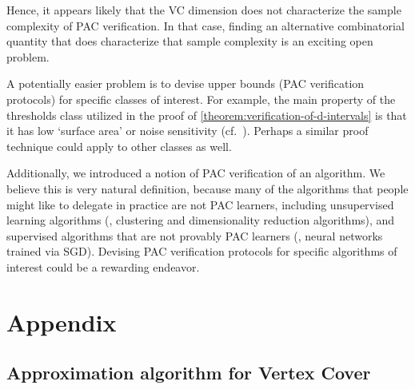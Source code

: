 \documentclass{toc}
\begin{document}
Hence, it appears likely that the VC dimension does not characterize the sample complexity of PAC verification. In that case, finding an alternative combinatorial quantity that does characterize that sample complexity is an exciting open problem. 

A potentially easier problem is to devise upper bounds (PAC verification protocols) for specific classes of interest. For example, the main property of the thresholds class utilized in the proof of \cref{theorem:verification-of-d-intervals} is that it has low `surface area' or noise sensitivity (cf.\ \cite{BalcanBBY12}). Perhaps a similar proof technique could apply to other classes as well.

Additionally, we introduced a notion of PAC verification of an algorithm. We believe this is very natural definition, because many of the algorithms that people
might like to delegate in practice are not PAC learners, including unsupervised learning algorithms
(\eg, clustering and dimensionality reduction algorithms), and supervised algorithms that are not provably PAC learners (\eg, neural networks trained via SGD). Devising PAC verification protocols for specific algorithms of interest could be a rewarding endeavor.


%
%

%

%

%

%
\section{Appendix}   %

%

%

%
%
\subsection{Approximation algorithm for Vertex Cover} %
\end{document}
